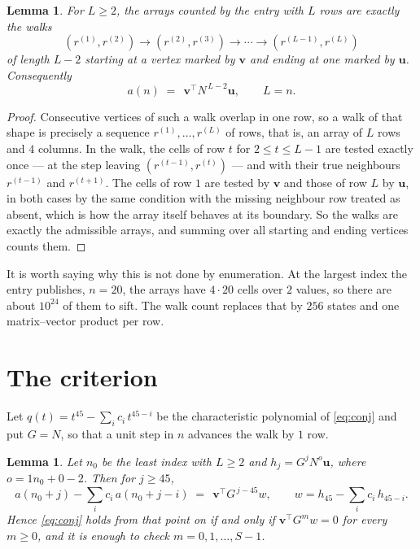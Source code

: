 \documentclass[11pt,a4paper]{article}
\theoremstyle{plain}
\newtheorem{lemma}[theorem]{Lemma}
\theoremstyle{definition}
\begin{document}
\begin{lemma}\label{lem:walk}
For $L\ge2$, the arrays counted by the entry with $L$ rows are exactly the walks
\[
(r^{(1)},r^{(2)})\to(r^{(2)},r^{(3)})\to\cdots\to(r^{(L-1)},r^{(L)})
\]
of length $L-2$ starting at a vertex marked by $\mathbf{v}$ and ending at one marked by
$\mathbf{u}$. Consequently
\[
a(n)\;=\;\,\mathbf{v}^{\!\top}N^{\,L-2}\mathbf{u},\qquad L=n .
\]
\end{lemma}

\begin{proof}
Consecutive vertices of such a walk overlap in one row, so a walk of that shape is
precisely a sequence $r^{(1)},\dots,r^{(L)}$ of rows, that is, an array of $L$ rows
and $4$ columns. In the walk, the cells of row $t$ for $2\le t\le L-1$ are tested
exactly once --- at the step leaving $(r^{(t-1)},r^{(t)})$ --- and with their true
neighbours $r^{(t-1)}$ and $r^{(t+1)}$. The cells of row $1$ are tested by
$\mathbf{v}$ and those of row $L$ by $\mathbf{u}$, in both cases by the same condition
with the missing neighbour row treated as absent, which is how the array itself behaves at
its boundary. So the walks are exactly the admissible arrays, and summing over all starting
and ending vertices counts them.
\end{proof}


It is worth saying why this is not done by enumeration. At the largest index the entry
publishes, $n=20$, the arrays have $4\cdot20$ cells over
$2$ values, so there are about $10^{24}$ of them to sift. The
walk count replaces that by $256$ states and one matrix--vector product per row.
\section{The criterion}

Let $q(t)=t^{45}-\sum_i c_i\,t^{45-i}$ be the characteristic polynomial of
\eqref{eq:conj} and put $G=N$, so that a unit step in $n$ advances the walk by
$1$ row.

\begin{lemma}\label{lem:crit}
Let $n_0$ be the least index with $L\ge2$ and $h_j=G^{j}N^{o}\mathbf{u}$, where
$o=1n_0+0-2$. Then for $j\ge45$,
\[
a(n_0+j)-\sum_i c_i\,a(n_0+j-i)\;=\;\,\mathbf{v}^{\!\top}G^{\,j-45}w,
\qquad w=h_{45}-\sum_i c_i\,h_{45-i} .
\]
Hence \eqref{eq:conj} holds from that point on if and only if
$\mathbf{v}^{\!\top}G^{m}w=0$ for every $m\ge0$, and it is enough to check
$m=0,1,\dots,S-1$.
\end{lemma}
\end{document}
